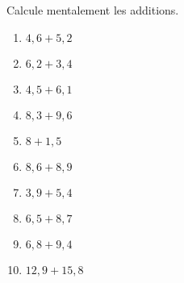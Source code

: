 \begin{exercice}
Calcule mentalement les additions.
\begin{enumerate} 
 \item $4,6 + 5,2$ \dotfill \hspace*{12em}
 
 \item $6,2 + 3,4$ \dotfill \hspace*{12em}
 
 \item $4,5 + 6,1$ \dotfill \hspace*{12em}
 
 \item $8,3 + 9,6$ \dotfill \hspace*{12em}
 
 \item $8 + 1,5$ \dotfill \hspace*{12em}
 
 \item $8,6 + 8,9$ \dotfill \hspace*{12em}
 
 \item $3,9 + 5,4$ \dotfill \hspace*{12em}
 
 \item $6,5 + 8,7$ \dotfill \hspace*{12em}
 
 \item $6,8 + 9,4$ \dotfill \hspace*{12em}
 
 \item \hspace{0.1em} $12,9 + 15,8$ \dotfill \hspace*{12em}

 \end{enumerate}
\end{exercice}


